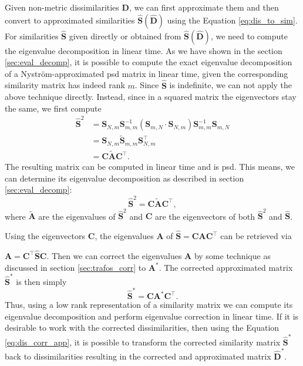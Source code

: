 \documentclass[twoside,11pt]{article}
\begin{document}
Given non-metric dissimilarities $\mathbf{D}$,
we can first approximate them and then convert to approximated similarities $\mathbf{\hat{S}}(\mathbf{\hat{D}})$
using the Equation \eqref{eq:dis_to_sim}.
For similarities $\mathbf{\hat{S}}$
given directly or obtained from $\mathbf{\hat{S}}(\mathbf{\hat{D}})$,
we need to compute the eigenvalue decomposition in linear time.
As we have shown in the section \ref{sec:eval_decomp},
it is possible to compute the exact eigenvalue decomposition
of a Nystr\"om-approximated psd matrix in linear time, given
the corresponding similarity matrix has indeed rank $m$.
Since $\mathbf{\hat{S}}$ is indefinite,
we can not apply the above technique directly.
Instead, since in a squared matrix the eigenvectors stay the same,
we first compute \begin{align*}
\mathbf{\hat{S}}^2 & = \mathbf{S}_{N,m} \mathbf{S}^{-1}_{m,m} \left( \mathbf{S}_{m,N}
	\cdot \mathbf{S}_{N,m} \right) \mathbf{S}^{-1}_{m,m} \mathbf{S}_{m,N}\\
& = \mathbf{S}_{N,m} \mathbf{\tilde{S}}_{m,m} \mathbf{S}_{N,m}^\top\\
& = \mathbf{C} \mathbf{\tilde{A}} \mathbf{C}^\top.
\end{align*}
The resulting matrix can be computed in linear time and is psd.
This means, we can determine its eigenvalue decomposition
as described in section \ref{sec:eval_decomp}:
\[
\mathbf{\hat{S}}^2 = \mathbf{C} \mathbf{\tilde{A}} \mathbf{C}^\top,
\]
where $\mathbf{\tilde{A}}$ are the eigenvalues of $\mathbf{\hat{S}}^2$
and $\mathbf{C}$ are the eigenvectors
of both $\mathbf{\hat{S}}^2$ and $\mathbf{\hat{S}}$.

Using the eigenvectors $\mathbf{C}$, the eigenvalues $\mathbf{A}$
of $\mathbf{\hat{S}}=\mathbf{C}\mathbf{A}\mathbf{C}^\top$
can be retrieved via

$\mathbf{A}=\mathbf{C}^\top \mathbf{\hat{S}} \mathbf{C}$.
Then we can correct the eigenvalues $\mathbf{A}$
by some technique as discussed in section \ref{sec:trafos_corr} to $\mathbf{A}^*$.
The corrected approximated matrix $\mathbf{\hat{S}}^*$ is then simply
\begin{equation}
\label{eq:sim_corr_app}
\mathbf{\hat{S}}^* = \mathbf{C} \mathbf{A}^* \mathbf{C}^\top.
\end{equation}
Thus, using a low rank representation of a similarity matrix
we can compute its eigenvalue decomposition
and perform eigenvalue correction in linear time.
If it is desirable to work with the corrected dissimilarities,
then using the Equation \eqref{eq:dis_corr_app}, it is possible to transform
the corrected similarity matrix $\mathbf{\hat{S}}^*$ back to dissimilarities
resulting in the corrected and approximated matrix $\mathbf{\hat{D}}^*$.
\end{document}
